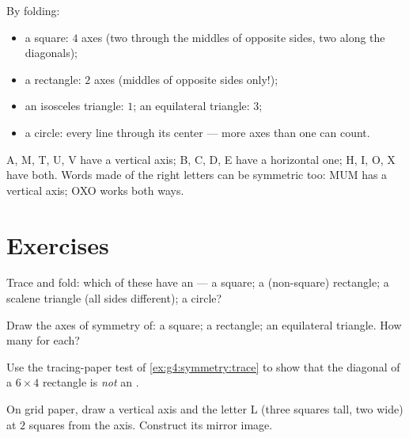 \begin{example}\label{ex:g4:symmetry:shapes}
By folding:
\begin{itemize}
  \item a square: $4$ axes (two through the middles of opposite
        sides, two along the diagonals);
  \item a rectangle: $2$ axes (middles of opposite sides only!);
  \item an isosceles triangle: $1$; an equilateral triangle: $3$;
  \item a circle: every line through its center --- more axes than
        one can count.
\end{itemize}
\end{example}

\begin{example}\label{ex:g4:symmetry:letters}
A, M, T, U, V have a vertical axis; B, C, D, E have a horizontal
one; H, I, O, X have both. Words made of the right letters can be
symmetric too: MUM has a vertical axis; OXO works both ways.
\end{example}

\section{Exercises}

\begin{exercise}[$\star$]\label{exo:g4:symmetry:1}
Trace and fold: which of these have an  --- a
square; a (non-square) rectangle; a scalene triangle (all sides
different); a circle?
\end{exercise}

\begin{exercise}[$\star$]\label{exo:g4:symmetry:2}
Draw the axes of symmetry of: a square; a rectangle; an equilateral
triangle. How many for each?
\end{exercise}

\begin{exercise}[$\star$]\label{exo:g4:symmetry:3}
Use the tracing-paper test of \cref{ex:g4:symmetry:trace} to show
that the diagonal of a $6 \times 4$ rectangle is \emph{not} an .
\end{exercise}

\begin{exercise}[$\star$]\label{exo:g4:symmetry:4}
On grid paper, draw a vertical axis and the letter L (three squares
tall, two wide) at $2$ squares from the axis. Construct its mirror
image.
\end{exercise}

